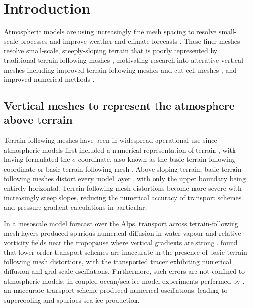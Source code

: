 \chapter{Introduction}

Atmospheric models are using increasingly fine mesh spacing to resolve small-scale processes and improve weather and climate forecasts \citep{wedi2014}.
These finer meshes resolve small-scale, steeply-sloping terrain that is poorly represented by traditional terrain-following meshes \citep{schaer2002}, motivating research into alterative vertical meshes including improved terrain-following meshes \citep{schaer2002,klemp2011} and cut-cell meshes \citep{jaehn2015,yamazaki2016}, and improved numerical methods \citep{zaengl2012,steppeler-klemp2017}.

\section{Vertical meshes to represent the atmosphere above terrain}

Terrain-following meshes have been in widespread operational use since atmospheric models first included a numerical representation of terrain \citep{steppeler2003}, with \citet{phillips1957} having formulated the $\sigma$ coordinate, also known as the basic terrain-following coordinate or basic terrain-following mesh \citep{galchen-somerville1975a}.
Above sloping terrain, basic terrain-following meshes distort every model layer , with only the upper boundary being entirely horizontal.
Terrain-following mesh distortions become more severe with increasingly steep slopes, reducing the numerical accuracy of transport schemes and pressure gradient calculations in particular.

In a mesoscale model forecast over the Alps, transport across terrain-following mesh layers produced spurious numerical diffusion in water vapour and relative vorticity fields near the tropopause where vertical gradients are strong \citep{hoinka-zaengl2004}.
\citet{schaer2002} found that lower-order transport schemes are inaccurate in the presence of basic terrain-following mesh distortions, with the transported tracer exhibiting numerical diffusion and grid-scale oscillations.
Furthermore, such errors are not confined to atmospheric models: in coupled ocean/sea-ice model experiments performed by \citet{naughten2017}, an inaccurate transport scheme produced numerical oscillations, leading to supercooling and spurious sea-ice production.

